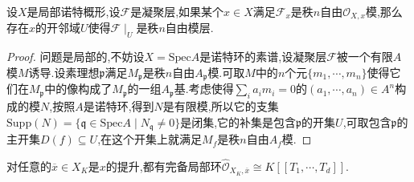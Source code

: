 设$X$是局部诺特概形,设$\mathscr{F}$是凝聚层,如果某个$x\in X$满足$\mathscr{F}_x$是秩$n$自由$\mathscr{O}_{X,x}$模,那么存在$x$的开邻域$U$使得$\mathscr{F}\mid_U$是秩$n$自由模层.
\begin{proof}
	
	问题是局部的,不妨设$X=\mathrm{Spec}A$是诺特环的素谱,设凝聚层$\mathscr{F}$被一个有限$A$模$M$诱导.设素理想$\mathfrak{p}$满足$M_{\mathfrak{p}}$是秩$n$自由$A_{\mathfrak{p}}$模.可取$M$中的$n$个元$\{m_1,\cdots,m_n\}$使得它们在$M_{\mathfrak{p}}$中的像构成了$M_{\mathfrak{p}}$的一组$A_{\mathfrak{p}}$基.考虑使得$\sum_ia_im_i=0$的$(a_1,\cdots,a_n)\in A^n$构成的模$N$,按照$A$是诺特环,得到$N$是有限模,所以它的支集$\mathrm{Supp}(N)=\{\mathfrak{q}\in\mathrm{Spec}A\mid N_{\mathfrak{q}}\not=0\}$是闭集,它的补集是包含$\mathfrak{p}$的开集$U$,可取包含$\mathfrak{p}$的主开集$D(f)\subseteq U$,在这个开集上就满足$M_f$是秩$n$自由$A_f$模.
\end{proof}


\item 对任意的$\overline{x}\in X_K$是$x$的提升,都有完备局部环$\widehat{\mathscr{O}}_{X_K,\overline{x}}\cong K[[T_1,\cdots,T_d]]$.




